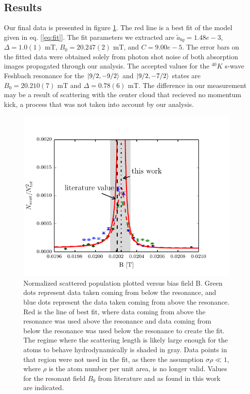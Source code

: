 \documentclass[12pt]{iopart}
\begin{document}
\subsection{Results}
Our final data is presented in figure \ref{fig:fittedFractions}. The red line is a best fit of the model given in eq. [\ref{eq:fit}]. The fit parameters we extracted are $\tilde{a}_{bg}=1.48e-3$, $\Delta = 1.0(1)$ mT, $B_0 = 20.247(2)$ mT, and $C=9.00e-5$. The error bars on the fitted data were obtained solely from photon shot noise of both absorption images propagated through our analysis.
The accepted values for the $^{40}K$ s-wave Feshbach resonance for the  $\mathinner{|{9/2,-9/2}\rangle}$ and $\mathinner{|{9/2,-7/2}\rangle}$ states are $B_0=20.210(7)$ mT and $\Delta=0.78(6)$ mT. The difference in our measurement may be a result of scattering with the center cloud that recieved no momentum kick, a process that was not taken into account by our analysis. 
\begin{figure}
	\includegraphics{figure11.pdf}
\caption{Normalized scattered population plotted versus bias field B. Green dots represent data taken coming from below the resonance, and blue dots represent the data taken coming from above the resonance. Red is the line of best fit, where data coming from above the resonance was used above the resonance and data coming from below the resonance was used below the resonance to create the fit. The regime where the scattering length is likely large enough for the atoms to behave hydrodynamically is shaded in gray. Data points in that region were not used in the fit, as there the assumption $\sigma\rho\ll1$, where $\rho$ is the atom number per unit area, is no longer valid. Values for the resonant field $B_0$ from literature and as found in this work are indicated.    }  
\label{fig:fittedFractions}
\end{figure}
\end{document}
